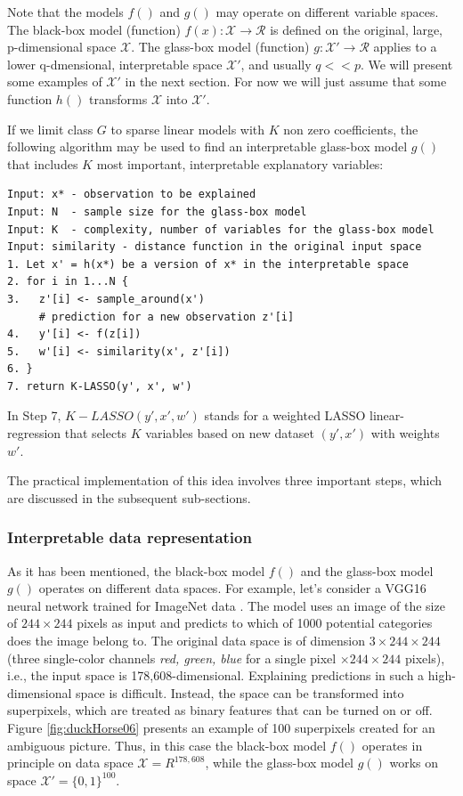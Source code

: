 \documentclass[12pt,]{krantz}
\begin{document}
Note that the models \(f()\) and \(g()\) may operate on different variable spaces. The black-box model (function) \(f(x):\mathcal X \rightarrow \mathcal R\) is defined on the original, large, p-dimensional space \(\mathcal X\). The glass-box model (function) \(g:\mathcal X' \rightarrow \mathcal R\) applies to a lower q-dmensional, interpretable space \(\mathcal X'\), and usually \(q << p\). We will present some examples of \(\mathcal X'\) in the next section. For now we will just assume that some function \(h()\) transforms \(\mathcal X\) into \(\mathcal X'\).

If we limit class \(G\) to sparse linear models with \(K\) non zero coefficients, the following algorithm may be used to find an interpretable glass-box model \(g()\) that includes \(K\) most important, interpretable explanatory variables:

\begin{verbatim}
Input: x* - observation to be explained
Input: N  - sample size for the glass-box model 
Input: K  - complexity, number of variables for the glass-box model
Input: similarity - distance function in the original input space
1. Let x' = h(x*) be a version of x* in the interpretable space
2. for i in 1...N {
3.   z'[i] <- sample_around(x') 
     # prediction for a new observation z'[i] 
4.   y'[i] <- f(z[i]) 
5.   w'[i] <- similarity(x', z'[i]) 
6. }
7. return K-LASSO(y', x', w')
\end{verbatim}

In Step 7, \(K-LASSO(y', x', w')\) stands for a weighted LASSO linear-regression that selects \(K\) variables based on new dataset \((y', x')\) with weights \(w'\).

The practical implementation of this idea involves three important steps, which are discussed in the subsequent sub-sections.

\hypertarget{interpretable-data-representation}{%
\subsubsection{Interpretable data representation}\label{interpretable-data-representation}}

As it has been mentioned, the black-box model \(f()\) and the glass-box model \(g()\) operates on different data spaces. For example, let's consider a VGG16 neural network \citep{Simonyan15} trained for ImageNet data \citep{ImageNet}. The model uses an image of the size of \(244 \times 244\) pixels as input and predicts to which of 1000 potential categories does the image belong to. The original data space is of dimension \(3 \times 244 \times 244\) (three single-color channels \emph{red, green, blue} for a single pixel \(\times 244 \times 244\) pixels), i.e., the input space is 178,608-dimensional. Explaining predictions in such a high-dimensional space is difficult. Instead, the space can be transformed into superpixels, which are treated as binary features that can be turned on or off. Figure \ref{fig:duckHorse06} presents an example of 100 superpixels created for an ambiguous picture. Thus, in this case the black-box model \(f()\) operates in principle on data space \(\mathcal X=R^{178,608}\), while the glass-box model \(g()\) works on space \(\mathcal X' = \{0,1\}^{100}\).
\end{document}
